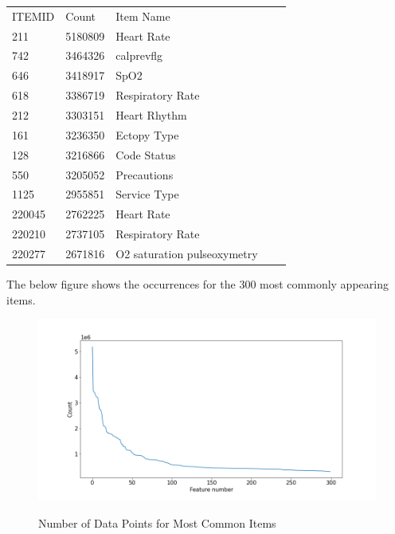 \documentclass[12pt]{article}
\begin{document}
\begin{center}
\captionsetup{type=table}
\begin{tabular}{|l|l|l|ll}
\cline{1-3}
ITEMID & Count   & Item Name                   &  &  \\ \cline{1-3}
211    & 5180809 & Heart Rate                  &  &  \\ \cline{1-3}
742    & 3464326 & calprevflg                  &  &  \\ \cline{1-3}
646    & 3418917 & SpO2                        &  &  \\ \cline{1-3}
618    & 3386719 & Respiratory Rate            &  &  \\ \cline{1-3}
212    & 3303151 & Heart Rhythm                &  &  \\ \cline{1-3}
161    & 3236350 & Ectopy Type                 &  &  \\ \cline{1-3}
128    & 3216866 & Code Status                 &  &  \\ \cline{1-3}
550    & 3205052 & Precautions                 &  &  \\ \cline{1-3}
1125   & 2955851 & Service Type                &  &  \\ \cline{1-3}
220045 & 2762225 & Heart Rate                  &  &  \\ \cline{1-3}
220210 & 2737105 & Respiratory Rate            &  &  \\ \cline{1-3}
220277 & 2671816 & O2 saturation pulseoxymetry &  &  \\ \cline{1-3}
\end{tabular}
\label{Most Common Items}
\end{center}

The below figure shows the occurrences for the 300 most commonly appearing items. 
\begin{figure}[H]
\centering\caption{Number of Data Points for Most Common Items}
\includegraphics[scale=0.5]{Number of Data Points for Most Common Items.png}
\label{Number of Data Points for Most Common Items)}
\end{figure}
\end{document}
